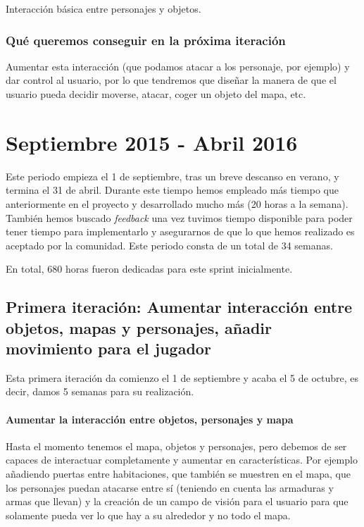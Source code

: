 Interacción básica entre personajes y objetos.

\subsubsection{Qué queremos conseguir en la próxima iteración}

Aumentar esta interacción (que podamos atacar a los personaje, por ejemplo) y dar control al usuario, por lo que tendremos que diseñar la manera de que el usuario pueda decidir moverse, atacar, coger un objeto del mapa, etc.

\section{Septiembre 2015 - Abril 2016}

Este periodo empieza el 1 de septiembre, tras un breve descanso en verano, y termina el 31 de abril. Durante este tiempo hemos empleado más tiempo que anteriormente en el proyecto y desarrollado mucho más (20 horas a la semana). También hemos buscado \textit{feedback} una vez tuvimos tiempo disponible para poder tener tiempo para implementarlo y asegurarnos de que lo que hemos realizado es aceptado por la comunidad. 
Este periodo consta de un total de 34 semanas.

En total, 680 horas fueron dedicadas para este sprint inicialmente.

\subsection{Primera iteración: Aumentar interacción entre objetos, mapas y personajes, añadir movimiento para el jugador}

Esta primera iteración da comienzo el 1 de septiembre y acaba el 5 de octubre, es decir, damos 5 semanas para su realización.

\paragraph{Aumentar la interacción entre objetos, personajes y mapa} Hasta el momento tenemos el mapa, objetos y personajes, pero debemos de ser capaces de interactuar completamente y aumentar en características. Por ejemplo añadiendo puertas entre habitaciones, que también se muestren en el mapa, que los personajes puedan atacarse entre sí (teniendo en cuenta las armaduras y armas que llevan) y la creación de un campo de visión para el usuario para que solamente pueda ver lo que hay a su alrededor y no todo el mapa.

